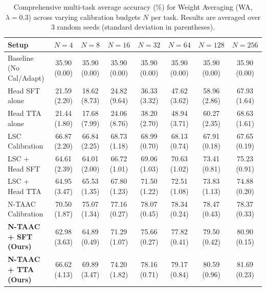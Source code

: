 \begin{table}[ht]
\centering
\caption{Comprehensive multi-task average accuracy (\%) for Weight Averaging (WA, $\lambda=0.3$) across varying calibration budgets $N$ per task. Results are averaged over 3 random seeds (standard deviation in parentheses).}
\label{tab:appendix_wa_03}
\vskip 0.15in
\begin{sc}
\begin{scriptsize}
\setlength{\tabcolsep}{3pt}
\begin{tabular}{lccccccc}
\toprule
Setup & $N=4$ & $N=8$ & $N=16$ & $N=32$ & $N=64$ & $N=128$ & $N=256$ \\
\midrule
Baseline (No Cal/Adapt) & 35.90 (0.00) & 35.90 (0.00) & 35.90 (0.00) & 35.90 (0.00) & 35.90 (0.00) & 35.90 (0.00) & 35.90 (0.00) \\
Head SFT alone & 21.59 (2.20) & 18.62 (8.73) & 24.82 (9.64) & 36.33 (3.32) & 47.62 (3.62) & 58.96 (2.86) & 67.93 (1.64) \\
Head TTA alone & 21.44 (1.80) & 17.68 (7.99) & 24.06 (8.76) & 38.20 (2.70) & 48.94 (3.71) & 60.27 (2.35) & 68.63 (1.61) \\
LSC Calibration & 66.87 (2.20) & 66.84 (2.25) & 68.73 (1.18) & 68.99 (0.70) & 68.13 (0.74) & 67.91 (0.18) & 67.65 (0.19) \\
LSC + Head SFT & 64.61 (2.39) & 64.01 (2.00) & 66.72 (1.01) & 69.06 (1.03) & 70.63 (1.02) & 73.41 (0.81) & 75.23 (0.91) \\
LSC + Head TTA & 64.95 (3.47) & 65.53 (1.35) & 67.80 (1.23) & 71.50 (1.22) & 72.51 (1.08) & 73.83 (1.13) & 74.88 (0.20) \\
N-TAAC Calibration & 70.50 (1.87) & 75.07 (1.34) & 77.16 (0.27) & 78.07 (0.45) & 78.34 (0.24) & 78.47 (0.43) & 78.37 (0.33) \\
\textbf{N-TAAC + SFT (Ours)} & 62.98 (3.63) & 64.89 (0.49) & 71.29 (1.07) & 75.66 (0.27) & 77.82 (0.41) & 79.50 (0.42) & 80.90 (0.15) \\
\textbf{N-TAAC + TTA (Ours)} & 66.62 (4.13) & 69.89 (3.47) & 74.20 (1.82) & 78.16 (0.71) & 79.17 (0.84) & 80.59 (0.96) & 81.69 (0.23) \\
\bottomrule
\end{tabular}
\end{scriptsize}
\end{sc}
\end{table}

